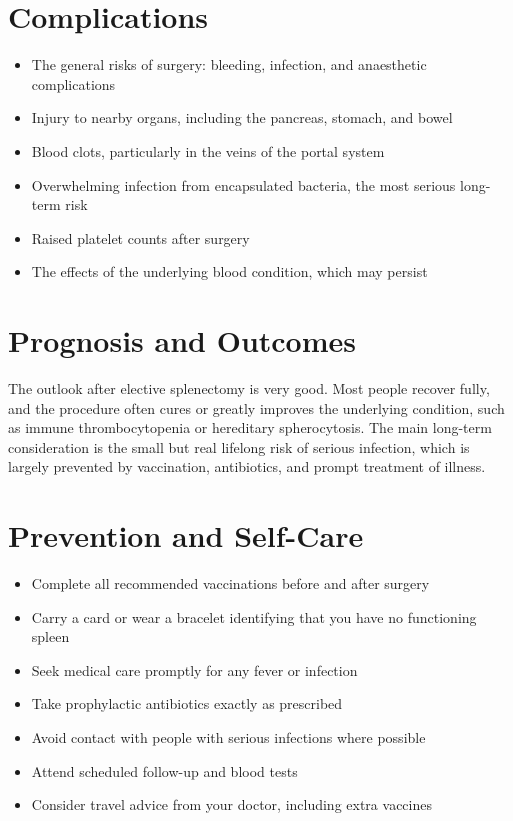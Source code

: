 \section*{Complications}
\begin{itemize}
    \item The general risks of surgery: bleeding, infection, and anaesthetic complications
    \item Injury to nearby organs, including the pancreas, stomach, and bowel
    \item Blood clots, particularly in the veins of the portal system
    \item Overwhelming infection from encapsulated bacteria, the most serious long-term risk
    \item Raised platelet counts after surgery
    \item The effects of the underlying blood condition, which may persist
\end{itemize}

\section*{Prognosis and Outcomes}
The outlook after elective splenectomy is very good. Most people recover fully, and the procedure often cures or greatly improves the underlying condition, such as immune thrombocytopenia or hereditary spherocytosis. The main long-term consideration is the small but real lifelong risk of serious infection, which is largely prevented by vaccination, antibiotics, and prompt treatment of illness.

\section*{Prevention and Self-Care}
\begin{itemize}
    \item Complete all recommended vaccinations before and after surgery
    \item Carry a card or wear a bracelet identifying that you have no functioning spleen
    \item Seek medical care promptly for any fever or infection
    \item Take prophylactic antibiotics exactly as prescribed
    \item Avoid contact with people with serious infections where possible
    \item Attend scheduled follow-up and blood tests
    \item Consider travel advice from your doctor, including extra vaccines
\end{itemize}

